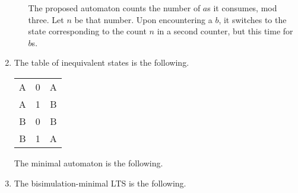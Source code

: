 \documentclass[letterpaper,11pt]{article}
\begin{document}
\begin{enumerate}
\begin{enumerate}
                The proposed automaton counts the number of $a$s it consumes,
                mod three. Let $n$ be that number. Upon encountering a $b$, it
                switches to the state corresponding to the count $n$ in a
                second counter, but this time for $b$s.
        \end{enumerate}

    \item The table of inequivalent states is the following.

        \begin{tabular}{c c c}
            A & 0 & A \\
            A & 1 & B \\
            B & 0 & B \\
            B & 1 & A
        \end{tabular}

        The minimal automaton is the following.

        \begin{figure}[H]
            \centering

        \end{figure}

    \item The bisimulation-minimal LTS is the following.

        \begin{figure}[H]
            \centering

\end{figure}
\end{enumerate}
\end{document}
